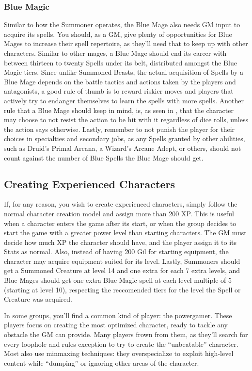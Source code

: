 \begin{multicols}{2}
\subsubsection{Blue Magic}\label{subsubsec:gm-blue}
Similar to how the Summoner operates, the Blue Mage also needs GM input to acquire its spells. You should, as a GM, give plenty of opportunities for Blue Mages to increase their spell repertoire, as they'll need that to keep up with other characters. Similar to other mages, a Blue Mage should end its career with between thirteen to twenty Spells under its belt, distributed amongst the Blue Magic tiers. Since unlike Summoned Beasts, the actual acquisition of Spells by a Blue Mage depends on the battle tactics and actions taken by the players and antagonists, a good rule of thumb is to reward riskier moves and players that actively try to endanger themselves to learn the spells with more spells. Another rule that a Blue Mage should keep in mind, is, as seen in , that the character may choose to not resist the action to be hit with it regardless of dice rolls, unless the action says otherwise. Lastly, remember to not punish the player for their choices in specialties and secondary jobs, as any Spells granted by other abilities, such as Druid's Primal Arcana, a Wizard's Arcane Adept, or others, should not count against the number of Blue Spells the Blue Mage should get.   

\subsection{Creating Experienced Characters}\label{subsec:gm-expchars}
If, for any reason, you wish to create experienced characters, simply follow the normal character creation model and assign more than 200 XP\@. This is useful when a character enters the game after its start, or when the group decides to start the game with a greater power level than starting characters. The GM must decide how much XP the character should have, and the player assign it to its Stats as normal. Also, instead of having 200 Gil for starting equipment, the character may acquire equipment suited for its level. Lastly, Summoners should get a Summoned Creature at level 14 and one extra for each 7 extra levels, and Blue Mages should get one extra Blue Magic spell at each level multiple of 5 (starting at level 10), respecting the reccomended tiers for the level the Spell or Creature was acquired.

\begin{mog}
    In some groups, you'll find a common kind of player: the powergamer. These players focus on creating the most optimized character, ready to tackle any obstacle the GM can provide. Many players frown from them, as they'll search for every loophole and rules exception to try to create the “unbeatable” character. Most also use minmaxing techniques: they overspecialize to exploit high-level content while “dumping” or ignoring other areas of the character. \pc%


\end{mog}
\end{multicols}
